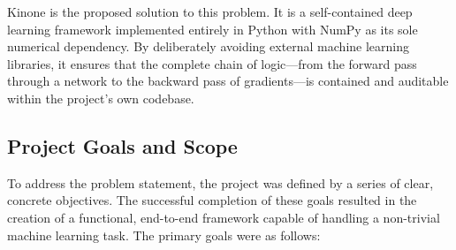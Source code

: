 \documentclass[a4paper]{article}
\begin{document}
Kinone is the proposed solution to this problem. It is a self-contained deep learning framework implemented entirely in Python with NumPy as its sole numerical dependency. By deliberately avoiding external machine learning libraries, it ensures that the complete chain of logic—from the forward pass through a network to the backward pass of gradients—is contained and auditable within the project's own codebase.

\subsection{Project Goals and Scope}

To address the problem statement, the project was defined by a series of clear, concrete objectives. The successful completion of these goals resulted in the creation of a functional, end-to-end framework capable of handling a non-trivial machine learning task. The primary goals were as follows:
\end{document}
